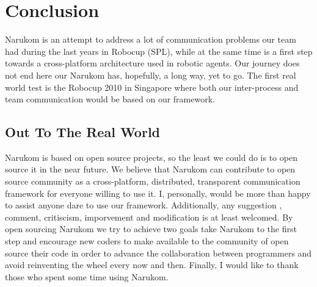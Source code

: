 \chapter{Conclusion}
\label{conclusion}

Narukom is an attempt to address a lot of communication problems our team had during the last years in Robocup (SPL), while at the same time is a first step towards a cross-platform architecture used in robotic agents. Our journey does not end here our Narukom has, hopefully, a long way, yet to go. The first real world test  is the Robocup 2010 in Singapore where both our inter-process and team communication would be based on our framework.

\section{Out To The Real World}
Narukom is based on open source projects, so the least we could do is to open source it in the near future. We believe that Narukom can contribute to open source community as a cross-platform, distributed, transparent communication framework for everyone willing to use it. I, personally, would be more than happy to assist anyone dare to use our framework. Additionally, any suggestion , comment, critiscism, imporvement and modification is at least welcomed. By open sourcing Narukom we try to achieve two goals take Narukom to the first step and encourage new coders to make available to the community of open source their code in order to advance the collaboration between programmers and avoid reinventing the wheel every now and then. Finally, I would like to thank those who spent some time using Narukom. 



